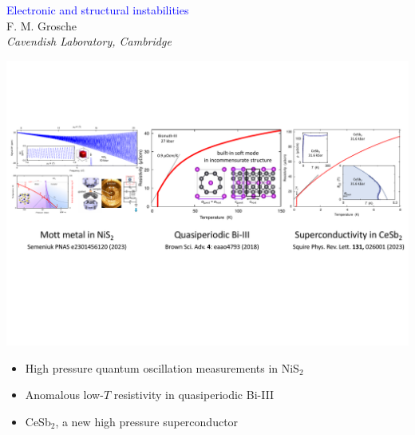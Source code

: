 \begin{emptyframe}
\begin{center}
\textcolor{Blue}{Electronic and structural instabilities} \\
\vspace{0.5em}
{\footnotesize F. M. Grosche} \\
{\footnotesize \em Cavendish Laboratory, Cambridge} \\
\vspace{0.1em}
\end{center}
\vspace{0.0em}
        \centerline{ \includegraphics[width=\columnwidth]{IntroPicture2}}

\vspace{1em}
\begin{itemize}
    \item<1-> High pressure quantum oscillation measurements in NiS$_2$
    \item<2-> Anomalous low-$T$ resistivity in quasiperiodic Bi-III
    \item<3-> CeSb$_2$, a new high pressure superconductor
\end{itemize}
\end{emptyframe}



